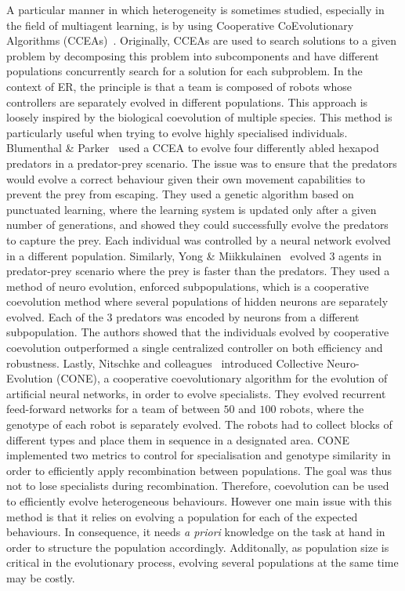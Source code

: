     A particular manner in which heterogeneity is sometimes studied, especially in the field of multiagent learning, is by using Cooperative CoEvolutionary Algorithms (CCEAs)~\parencite{Potter1994}. Originally, CCEAs are used to search solutions to a given problem by decomposing this problem into subcomponents and have different populations concurrently search for a solution for each subproblem. In the context of ER, the principle is that a team is composed of robots whose controllers are separately evolved in different populations. This approach is loosely inspired by the biological coevolution of multiple species. This method is particularly useful when trying to evolve highly specialised individuals. Blumenthal \& Parker~\parencite{Blumenthal2004} used a CCEA to evolve four differently abled hexapod predators in a predator-prey scenario. The issue was to ensure that the predators would evolve a correct behaviour given their own movement capabilities to prevent the prey from escaping. They used a genetic algorithm based on punctuated learning, where the learning system is updated only after a given number of generations, and showed they could successfully evolve the predators to capture the prey. Each individual was controlled by a neural network evolved in a different population. Similarly, Yong \& Miikkulainen~\parencite{Yong2009} evolved $3$ agents in predator-prey scenario where the prey is faster than the predators. They used a method of neuro evolution, enforced subpopulations, which is a cooperative coevolution method where several populations of hidden neurons are separately evolved. Each of the $3$ predators was encoded by neurons from a different subpopulation. The authors showed that the individuals evolved by cooperative coevolution outperformed a single centralized controller on both efficiency and robustness. Lastly, Nitschke and colleagues~\parencite{Nitschke2012} introduced Collective Neuro-Evolution (CONE), a cooperative coevolutionary algorithm for the evolution of artificial neural networks, in order to evolve specialists. They evolved recurrent feed-forward networks for a team of between $50$ and $100$ robots, where the genotype of each robot is separately evolved. The robots had to collect blocks of different types and place them in sequence in a designated area. CONE implemented two metrics to control for specialisation and genotype similarity in order to efficiently apply recombination between populations. The goal was thus not to lose specialists during recombination. Therefore, coevolution can be used to efficiently evolve heterogeneous behaviours. However one main issue with this method is that it relies on evolving a population for each of the expected behaviours. In consequence, it needs \emph{a priori} knowledge on the task at hand in order to structure the population accordingly. Additonally, as population size is critical in the evolutionary process, evolving several populations at the same time may be costly.


